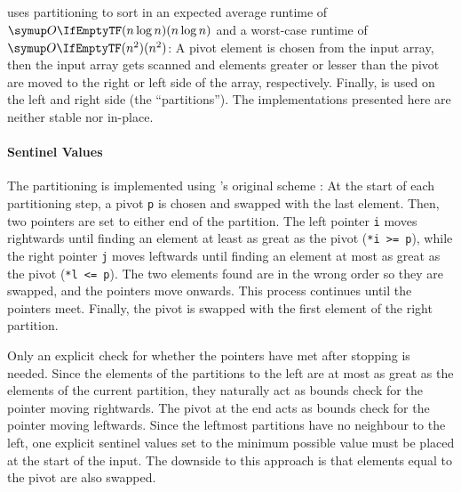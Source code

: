 \subsection{\texorpdfstring{\QS{}}{QuickSort}}
\label{subsec:tasklet:quick}


\QS{} \cite{hoare1962quicksort} uses partitioning to sort in an expected average runtime of \(\bigoh{n \log n}\) and a worst-case runtime of \(\bigoh{n^2}\):
A pivot element is chosen from the input array, then the input array gets scanned and elements greater or lesser than the pivot are moved to the right or left side of the array, respectively.
Finally, \QS{} is used on the left and right side (the \enquote{partitions}).
The \QS*{} implementations presented here are neither stable nor in-place.


\paragraph{Sentinel Values}
The partitioning is implemented using \citeauthor{hoare1962quicksort}'s original scheme \cite{hoare1962quicksort}:
At the start of each partitioning step, a pivot \lstinline|p| is chosen and swapped with the last element.
Then, two pointers are set to either end of the partition.
The left pointer \lstinline|i| moves rightwards until finding an element at least as great as the pivot (\lstinline|*i >= p|), while the right pointer \lstinline|j| moves leftwards until finding an element at most as great as the pivot (\lstinline|*l <= p|).
The two elements found are in the wrong order so they are swapped, and the pointers move onwards.
This process continues until the pointers meet.
Finally, the pivot is swapped with the first element of the right partition.

Only an explicit check for whether the pointers have met after stopping is needed.
Since the elements of the partitions to the left are at most as great as the elements of the current partition, they naturally act as bounds check for the pointer moving rightwards.
The pivot at the end acts as bounds check for the pointer moving leftwards.
Since the leftmost partitions have no neighbour to the left, one explicit sentinel values set to the minimum possible value must be placed at the start of the input.
The downside to this approach is that elements equal to the pivot are also swapped.

